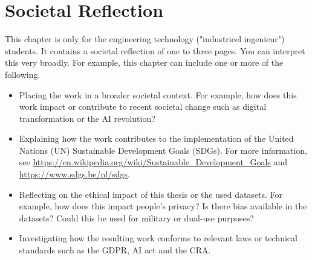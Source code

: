\chapter*{Societal Reflection}


This chapter is only for the engineering technology ("industrieel ingenieur") students. It contains a societal reflection of one to three pages. You can interpret this very broadly. For example, this chapter can include one or more of the following.

\begin{itemize}
    \item Placing the work in a broader societal context. For example, how does this work impact or contribute to recent societal change such as digital transformation or the AI revolution?
    \item Explaining how the work contributes to the implementation of the United Nations (UN) Sustainable Development Goals (SDGs). For more information, see \url{https://en.wikipedia.org/wiki/Sustainable_Development_Goals} and \url{https://www.sdgs.be/nl/sdgs}.
    \item Reflecting on the ethical impact of this thesis or the used datasets. For example, how does this impact people's privacy? Is there bias available in the datasets? Could this be used for military or dual-use purposes?
    \item Investigating how the resulting work conforms to relevant laws or technical standards such as the GDPR, AI act and the CRA.
\end{itemize}
